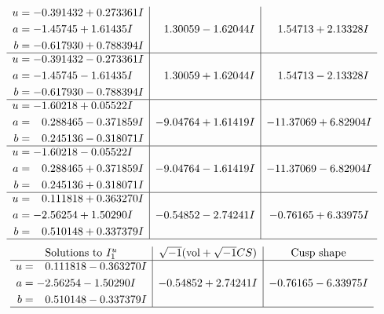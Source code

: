 \documentclass[1p]{elsarticle_modified}
\theoremstyle{definition}
\newcommand{\I}{\sqrt{-1}}
\begin{document}
$$\begin{array}{c|c|c}
\begin{aligned}
u &= -0.391432 + 0.273361 I \\
a &= -1.45745 + 1.61435 I \\
b &= -0.617930 + 0.788394 I\end{aligned}
 & \phantom{-}1.30059 - 1.62044 I & \phantom{-}1.54713 + 2.13328 I \\ \hline\begin{aligned}
u &= -0.391432 - 0.273361 I \\
a &= -1.45745 - 1.61435 I \\
b &= -0.617930 - 0.788394 I\end{aligned}
 & \phantom{-}1.30059 + 1.62044 I & \phantom{-}1.54713 - 2.13328 I \\ \hline\begin{aligned}
u &= -1.60218 + 0.05522 I \\
a &= \phantom{-}0.288465 - 0.371859 I \\
b &= \phantom{-}0.245136 - 0.318071 I\end{aligned}
 & -9.04764 + 1.61419 I & -11.37069 + 6.82904 I \\ \hline\begin{aligned}
u &= -1.60218 - 0.05522 I \\
a &= \phantom{-}0.288465 + 0.371859 I \\
b &= \phantom{-}0.245136 + 0.318071 I\end{aligned}
 & -9.04764 - 1.61419 I & -11.37069 - 6.82904 I \\ \hline\begin{aligned}
u &= \phantom{-}0.111818 + 0.363270 I \\
a &= -2.56254 + 1.50290 I \\
b &= \phantom{-}0.510148 + 0.337379 I\end{aligned}
 & -0.54852 - 2.74241 I & -0.76165 + 6.33975 I\\
 \hline 
 \end{array}$$\newpage$$\begin{array}{c|c|c}  
\text{Solutions to }I^u_{1}& \I (\text{vol} + \sqrt{-1}CS) & \text{Cusp shape}\\
 \hline 
\begin{aligned}
u &= \phantom{-}0.111818 - 0.363270 I \\
a &= -2.56254 - 1.50290 I \\
b &= \phantom{-}0.510148 - 0.337379 I\end{aligned}
 & -0.54852 + 2.74241 I & -0.76165 - 6.33975 I\\
 \hline 
 \end{array}$$\newpage\newpage\renewcommand{\arraystretch}{1}
\end{document}
